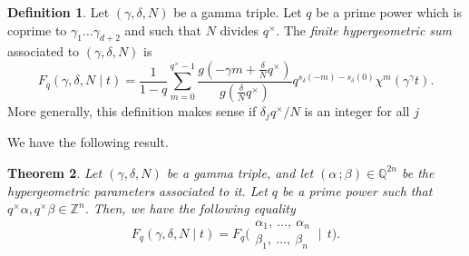 \documentclass[11pt, reqno]{amsart}
\theoremstyle{plain}
\newtheorem{theo}{Theorem}[section]
\theoremstyle{definition}
\newtheorem{defi}[theo]{Definition}
\newcommand{\Z}{\mathbb{Z}}
\newcommand{\Q}{\mathbb{Q}}
\newcommand{\ga}{\gamma}
\newcommand{\be}{\beta}
\newcommand{\al}{\alpha}
\begin{document}
\begin{defi}\label{defi:finite-hg-function-gamma}
Let $(\ga,\delta, N)$ be a gamma triple. 
Let $q$ be a prime power which is coprime to $\ga_1 \dots \ga_{d+2}$ and such that $N$ divides $q^\times$. 
The \emph{finite hypergeometric sum} associated to  $(\ga,\delta,N)$ is
\begin{equation}
F_q\left(\gamma, \delta,N \mid t\right) = \frac{1}{1-q}\sum_{m=0}^{q^\times-1}\frac{g\left(-\gamma m +\frac{\delta}{N} q^\times\right)} {g\left(\frac{\delta}{N} q^\times\right)}  q^{s_{\delta}(-m)-s_{\delta}(0)} \chi^m(\gamma^{\gamma}t).
\end{equation}
More generally, this definition makes sense if $\delta_{j}q^\times/N $ is an integer for all $j$
\end{defi}
We have the following result.
\begin{theo}\label{theo:equality-of-finite-hg-sums}
Let $(\ga,\delta,N)$ be a gamma triple, and let $(\al \,;\be) \in \Q^{2n}$ be the hypergeometric parameters associated to it. 
Let $q$ be a prime power such that $q^{\times} \al, q^{\times} \be \in \Z^{n}$. 
Then, we have the following equality
\begin{equation}\label{eq:equality-of-different-finit-hgs}
F_q\left(\gamma, \delta,N \mid t\right) = F_q\biggl(\begin{matrix} \al_1, \ \ldots, \ \al_n \\ \be_1, \ \ldots, \ \be_n \end{matrix} \:\bigg|\:\: t\biggr).
\end{equation}
\end{theo}
\end{document}
